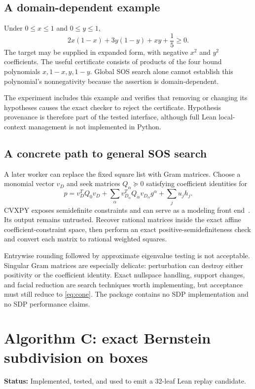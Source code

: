 \documentclass[11pt,a4paper]{article}
\theoremstyle{definition}
\newcommand{\status}[1]{\textbf{Status:} #1.}
\begin{document}
\subsection{A domain-dependent example}

Under $0\le x\le1$ and $0\le y\le1$,
\[
 2x(1-x)+3y(1-y)+xy+\frac15\ge0.
\]
The target may be supplied in expanded form, with negative $x^2$ and $y^2$ coefficients. The useful certificate consists of products of the four bound polynomials $x,1-x,y,1-y$. Global SOS search alone cannot establish this polynomial's nonnegativity because the assertion is domain-dependent.

The experiment includes this example and verifies that removing or changing its hypotheses causes the exact checker to reject the certificate. Hypothesis provenance is therefore part of the tested interface, although full Lean local-context management is not implemented in Python.

\subsection{A concrete path to general SOS search}

A later worker can replace the fixed square list with Gram matrices. Choose a monomial vector $v_D$ and seek matrices $Q_\alpha\succeq0$ satisfying coefficient identities for
\[
 p= v_D^TQ_0v_D+
     \sum_\alpha v_{D_\alpha}^TQ_\alpha v_{D_\alpha}g^\alpha
     +\sum_j u_jh_j.
\]
CVXPY exposes semidefinite constraints and can serve as a modeling front end~\cite{cvxpy}. Its output remains untrusted. Recover rational matrices inside the exact affine coefficient-constraint space, then perform an exact positive-semidefiniteness check and convert each matrix to rational weighted squares.

Entrywise rounding followed by approximate eigenvalue testing is not acceptable. Singular Gram matrices are especially delicate: perturbation can destroy either positivity or the coefficient identity. Exact nullspace handling, support changes, and facial reduction are search techniques worth implementing, but acceptance must still reduce to \eqref{eq:cone}. The package contains no SDP implementation and no SDP performance claims.

\section{Algorithm C: exact Bernstein subdivision on boxes}
\status{Implemented, tested, and used to emit a 32-leaf Lean replay candidate}
\end{document}
